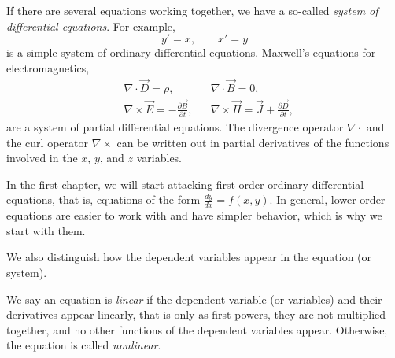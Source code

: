 \documentclass{ximera}
\begin{document}
If there are several equations working together, we have a so-called \emph{system of differential equations}.  For example,
\begin{equation*}
    y' = x , \qquad x' = y
\end{equation*}
is a simple system of ordinary differential equations. Maxwell's equations for electromagnetics,
\begin{align*}
    & \nabla \cdot \vec{D} = \rho, & & \nabla \cdot \vec{B} = 0 , \\
    & \nabla \times \vec{E} = - \frac{\partial \vec{B}}{\partial t}, &
    & \nabla \times \vec{H} = \vec{J} + \frac{\partial \vec{D}}{\partial t} ,
\end{align*}
are a system of partial differential equations. The divergence operator $\nabla \cdot$ and the curl operator $\nabla \times$ can be written out in partial derivatives of the functions involved in the $x$, $y$, and $z$ variables.


In the first chapter, we will start attacking first order ordinary differential equations, that is, equations of the form $\frac{dy}{dx} = f(x,y)$. In general, lower order equations are easier to work with and have simpler behavior, which is why we start with them.

We also distinguish how the dependent variables appear in the equation (or system).  
\begin{definition}
    We say an equation is \emph{linear} if the dependent variable (or variables) and their derivatives appear linearly, that is only as first powers, they are not multiplied together, and no other functions of the dependent variables appear. Otherwise, the equation is called \emph{nonlinear}.
\end{definition}
\end{document}
